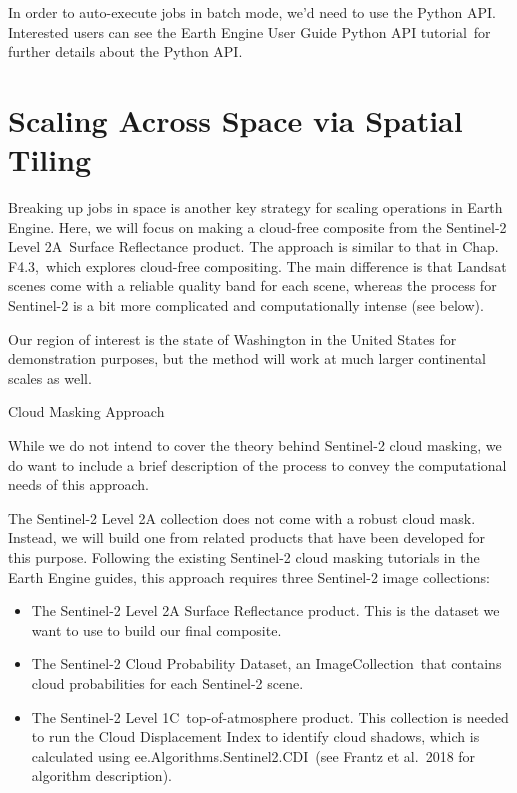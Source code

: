 \documentclass[
  letterpaper,
  DIV=11,
  numbers=noendperiod]{scrreprt}
\providecommand{\tightlist}{%
  \setlength{\itemsep}{0pt}\setlength{\parskip}{0pt}}\usepackage{longtable,booktabs,array}
\begin{document}
In order to auto-execute jobs in batch mode, we'd need to use the Python
API. Interested users can see the Earth Engine User Guide Python API
tutorial~for further details about the Python API.~

\hypertarget{scaling-across-space-via-spatial-tiling}{%
\section{Scaling Across Space via Spatial
Tiling}\label{scaling-across-space-via-spatial-tiling}}

Breaking up jobs in space is another key strategy for scaling operations
in Earth Engine. Here, we will focus on making a cloud-free composite
from the Sentinel-2 Level 2A~Surface Reflectance product. The approach
is similar to that in Chap. F4.3,~which explores cloud-free compositing.
The main difference is that Landsat scenes come with a reliable quality
band for each scene, whereas the process for Sentinel-2 is a bit more
complicated and computationally intense (see below).

Our region of interest is the state of Washington in the United States
for demonstration purposes, but the method will work at much larger
continental scales as well.

Cloud Masking Approach

While we do not intend to cover the theory behind Sentinel-2 cloud
masking, we do want to include a brief description of the process to
convey the computational needs of this approach.

The Sentinel-2 Level 2A collection does not come with a robust cloud
mask. Instead, we will build one from related products that have been
developed for this purpose. Following the existing Sentinel-2 cloud
masking tutorials in the Earth Engine guides, this approach requires
three Sentinel-2 image collections:

\begin{itemize}
\tightlist
\item
  The Sentinel-2 Level 2A Surface Reflectance product. This is the
  dataset we want to use to build our final composite.
\item
  The Sentinel-2 Cloud Probability Dataset, an ImageCollection~that
  contains cloud probabilities for each Sentinel-2 scene.
\item
  The Sentinel-2 Level 1C~top-of-atmosphere product. This collection is
  needed to run the Cloud Displacement Index to identify cloud shadows,
  which is calculated using ee.Algorithms.Sentinel2.CDI~(see Frantz et
  al.~2018 for algorithm description).
\end{itemize}
\end{document}
